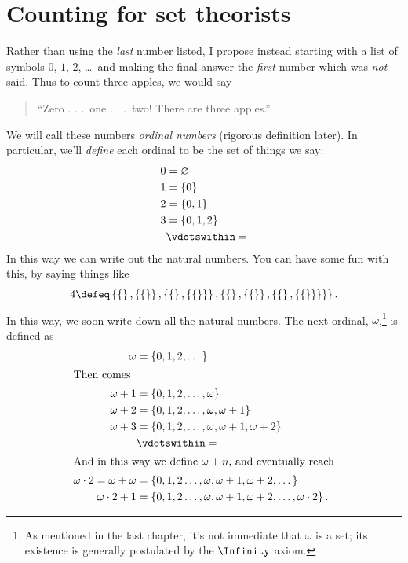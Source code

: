 \section{Counting for set theorists}
Rather than using the \emph{last} number listed, I propose instead
starting with a list of symbols $0$, $1$, $2$, \dots\ and making
the final answer the \emph{first} number which was \emph{not} said.
Thus to count three apples, we would say
\begin{quote}
	``Zero . . .\ one . . .\ two!  There are three apples.''
\end{quote}
We will call these numbers \emph{ordinal numbers} (rigorous definition later).
In particular, we'll \emph{define} each ordinal to be the set of things we say:
\begin{align*}
	0 &= \varnothing \\
	1 &= \{0\} \\
	2 &= \{0,1\} \\
	3 &= \{0,1,2\} \\
	&\vdotswithin=
\end{align*}
In this way we can write out the natural numbers.
You can have some fun with this, by saying things like
\[
	4 \defeq
	\left\{
		\left\{  \right\},
		\left\{ \left\{  \right\} \right\},
		\left\{ \left\{  \right\}, \left\{ \left\{  \right\} \right\} \right\},
		\left\{
			\left\{  \right\},
			\left\{ \left\{  \right\} \right\},
			\left\{ \left\{  \right\}, \left\{ \left\{  \right\} \right\} \right\}
		\right\}
	\right\}.
\]
In this way, we soon write down all the natural numbers.
The next ordinal, $\omega$,\footnote{As mentioned in the last chapter,
	it's not immediate that $\omega$ is a set;
	its existence is generally postulated by the $\Infinity$ axiom.
} is defined as
\begin{align*}
	\omega &= \left\{ 0, 1, 2, \dots \right\} \\
	\intertext{Then comes}
	\omega+1 &= \left\{ 0, 1, 2, \dots, \omega \right\} \\
	\omega+2 &= \left\{ 0, 1, 2, \dots, \omega, \omega+1 \right\} \\
	\omega+3 &= \left\{ 0, 1, 2, \dots, \omega, \omega+1, \omega+2 \right\} \\
	&\vdotswithin= \\
	\intertext{And in this way we define $\omega+n$, and eventually reach}
	\omega \cdot 2 = \omega+\omega &= \left\{ 0, 1, 2 \dots, \omega, \omega+1, \omega+2, \dots \right\} \\
	\omega \cdot 2 + 1 &= \left\{ 0, 1, 2 \dots, \omega, \omega+1, \omega+2, \dots, \omega \cdot 2 \right\}.
\end{align*}
